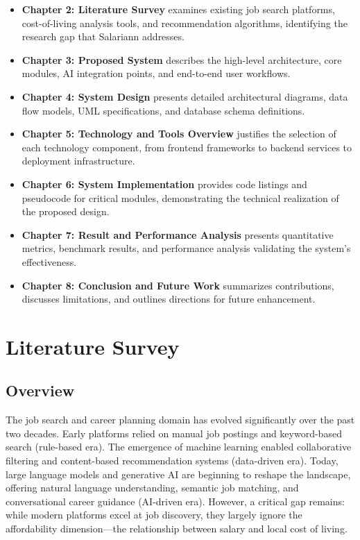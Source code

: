 \documentclass[12pt,a4paper,oneside]{report}
\begin{document}
\begin{itemize}
    \item \textbf{Chapter 2: Literature Survey} examines existing job search platforms, cost-of-living analysis tools, and recommendation algorithms, identifying the research gap that Salariann addresses.
    
    \item \textbf{Chapter 3: Proposed System} describes the high-level architecture, core modules, AI integration points, and end-to-end user workflows.
    
    \item \textbf{Chapter 4: System Design} presents detailed architectural diagrams, data flow models, UML specifications, and database schema definitions.
    
    \item \textbf{Chapter 5: Technology and Tools Overview} justifies the selection of each technology component, from frontend frameworks to backend services to deployment infrastructure.
    
    \item \textbf{Chapter 6: System Implementation} provides code listings and pseudocode for critical modules, demonstrating the technical realization of the proposed design.
    
    \item \textbf{Chapter 7: Result and Performance Analysis} presents quantitative metrics, benchmark results, and performance analysis validating the system's effectiveness.
    
    \item \textbf{Chapter 8: Conclusion and Future Work} summarizes contributions, discusses limitations, and outlines directions for future enhancement.
\end{itemize}

\chapter{Literature Survey}

\section{Overview}

The job search and career planning domain has evolved significantly over the past two decades. Early platforms relied on manual job postings and keyword-based search (rule-based era). The emergence of machine learning enabled collaborative filtering and content-based recommendation systems (data-driven era). Today, large language models and generative AI are beginning to reshape the landscape, offering natural language understanding, semantic job matching, and conversational career guidance (AI-driven era). However, a critical gap remains: while modern platforms excel at job discovery, they largely ignore the affordability dimension---the relationship between salary and local cost of living.
\end{document}
